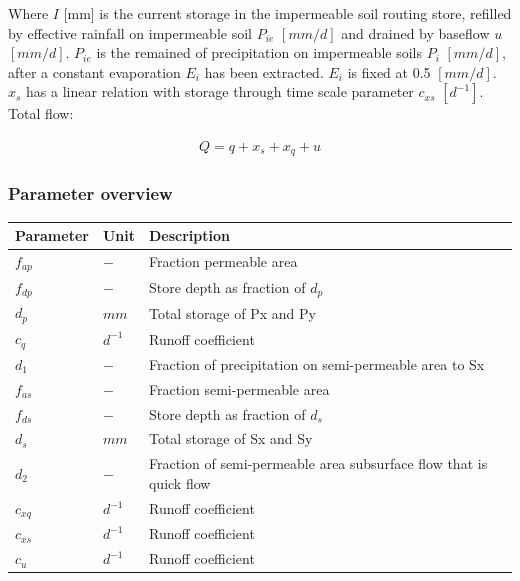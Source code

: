 Where $I$ [mm] is the current storage in the impermeable soil routing store, refilled by effective rainfall on impermeable soil $P_{ie}$ $[mm/d]$ and drained by baseflow $u$ $[mm/d]$.
$P_{ie}$ is the remained of precipitation on impermeable soils $P_i$ $[mm/d]$, after a constant evaporation $E_i$ has been extracted.
$E_i$ is fixed at 0.5 $[mm/d]$.
$x_s$ has a linear relation with storage through time scale parameter $c_{xs}$ $[d^{-1}]$.
Total flow:

\begin{align}
	Q = q+x_s+x_q+u
\end{align}

\subsubsection{Parameter overview}
\begin{table}[htbp]
  \centering
    \begin{tabular}{lll}
    \toprule
    Parameter & Unit  & Description \\
    \midrule
    $f_{ap}$ & $-$   & Fraction permeable area \\
    $f_{dp}$ & $-$   & Store depth as fraction of $d_p$ \\
    $d_p$ & $mm$  & Total storage of Px and Py \\
    $c_q$ & $d^{-1}$ & Runoff coefficient \\
    $d_1$ & $-$   & Fraction of precipitation on semi-permeable area to Sx \\
    $f_{as}$ & $-$   & Fraction semi-permeable area \\
    $f_{ds}$ & $-$   & Store depth as fraction of $d_s$ \\
    $d_s$ & $mm$  & Total storage of Sx and Sy \\
    $d_2$ & $-$   & Fraction of semi-permeable area subsurface flow that is quick flow \\
    $c_{xq}$ & $d^{-1}$ & Runoff coefficient \\
    $c_{xs}$ & $d^{-1}$ & Runoff coefficient \\
    $c_{u}$ & $d^{-1}$ & Runoff coefficient \\
    \bottomrule
    \end{tabular}%
  \label{tab:addlabel}%
\end{table}%
